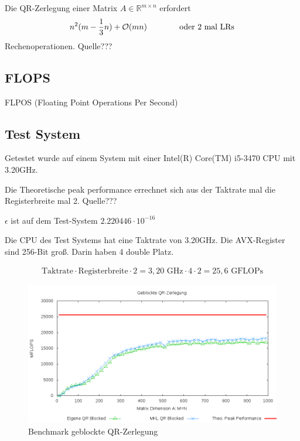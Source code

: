 Die QR-Zerlegung einer Matrix $A \in \mathbb{R}^{m \times n}$  erfordert
\begin{align*}
n^2(m-\frac{1}{3} n) + {\cal O}(mn) \qquad \qquad \text{oder 2 mal LRs}
\end{align*}
Rechenoperationen. Quelle???

\subsection{FLOPS}
FLPOS (Floating Point Operations Per Second) 

\subsection{Test System}

Getestet wurde auf einem System mit einer Intel(R) Core(TM) i5-3470 CPU mit 3.20GHz. 

Die Theoretische peak performance errechnet sich aus der Taktrate mal die Registerbreite mal 2. Quelle???

$\epsilon$ ist auf dem Test-System $2.220446\cdot10^{-16}$

Die CPU des Test Systems hat eine Taktrate von 3.20GHz.
Die AVX-Register sind 256-Bit groß. Darin haben 4 double Platz.

\begin{align*}
	\text{Taktrate} \cdot \text{Registerbreite} \cdot 2= 3,20 \text{ GHz} \cdot 4 \cdot 2 = 25,6 \text{ GFLOPs}
\end{align*}

\begin{figure}[H]
	\includegraphics[width=\textwidth]{images/blk.png}
	\caption{Benchmark geblockte QR-Zerlegung}
	\label{img:blk}
\end{figure}

